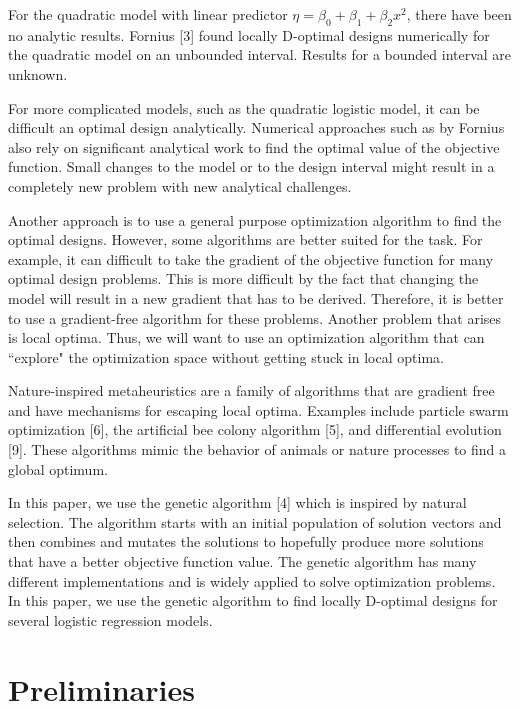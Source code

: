 \documentclass[11pt,a4paper]{article}
\begin{document}
For the quadratic model with linear predictor $\eta = \beta_0 + \beta_1 + \beta_2x^2$, there have been no analytic results. Fornius [3] found locally D-optimal designs numerically for the quadratic model on an unbounded interval. Results for a bounded interval are unknown.

For more complicated models, such as the quadratic logistic model, it can be difficult an optimal design analytically. Numerical approaches such as by Fornius also rely on significant analytical work to find the optimal value of the objective function. Small changes to the model or to the design interval might result in a completely new problem with new analytical challenges.

Another approach is to use a general purpose optimization algorithm to find the optimal designs. However, some algorithms are better suited for the task. For example, it can difficult to take the gradient of the objective function for many optimal design problems. This is more difficult by the fact that changing the model will result in a new gradient that has to be derived. Therefore, it is better to use a gradient-free algorithm for these problems. Another problem that arises is local optima. Thus, we will want to use an optimization algorithm that can ``explore" the optimization space without getting stuck in local optima.

Nature-inspired metaheuristics are a family of algorithms that are gradient free and have mechanisms for escaping local optima. Examples include particle swarm optimization [6], the artificial bee colony algorithm [5], and differential evolution [9]. These algorithms mimic the behavior of animals or nature processes to find a global optimum. 

In this paper, we use the genetic algorithm [4] which is inspired by natural selection. The algorithm starts with an initial population of solution vectors and then combines and mutates the solutions to hopefully produce more solutions that have a better objective function value. The genetic algorithm has many different implementations and is widely applied to solve optimization problems. In this paper, we use the genetic algorithm to find locally D-optimal designs for several logistic regression models.






\section{Preliminaries}
\end{document}
